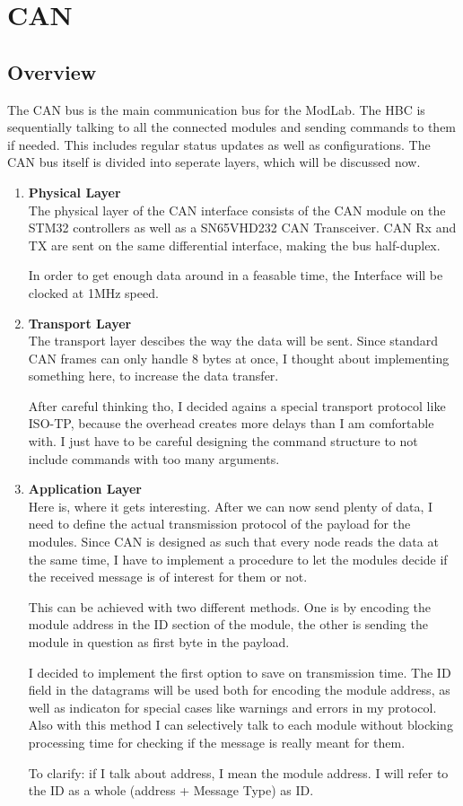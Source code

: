 \section{CAN}
\subsection{Overview}
The CAN bus is the main communication bus for the ModLab. The HBC is sequentially talking to all the connected modules and sending commands to them if needed. This includes regular status updates as well as configurations. The CAN bus itself is divided into seperate layers, which will be discussed now. 

\begin{enumerate}
    \item \textbf{Physical Layer}\\
    The physical layer of the CAN interface consists of the CAN module on the STM32 controllers as well as a SN65VHD232 CAN Transceiver. CAN Rx and TX are sent on the same differential interface, making the bus half-duplex. 

    In order to get enough data around in a feasable time, the Interface will be clocked at 1MHz speed. 
    \item \textbf{Transport Layer}\\
    The transport layer descibes the way the data will be sent. Since standard CAN frames can only handle 8 bytes at once, I thought about implementing something here, to increase the data transfer. 
    
    After careful thinking tho, I decided agains a special transport protocol like ISO-TP, because the overhead creates more delays than I am comfortable with. I just have to be careful designing the command structure to not include commands with too many arguments.

    \item \textbf{Application Layer}\\
    Here is, where it gets interesting. After we can now send plenty of data, I need to define the actual transmission protocol of the payload for the modules. Since CAN is designed as such that every node reads the data at the same time, I have to implement a procedure to let the modules decide if the received message is of interest for them or not. 

    This can be achieved with two different methods. One is by encoding the module address in the ID section of the module, the other is sending the module in question as first byte in the payload. 

    I decided to implement the first option to save on transmission time. The ID field in the datagrams will be used both for encoding the module address, as well as indicaton for special cases like warnings and errors in my protocol. Also with this method I can selectively talk to each module without blocking processing time for checking if the message is really meant for them. 

    To clarify: if I talk about address, I mean the module address. I will refer to the ID as a whole (address + Message Type) as ID.
\end{enumerate}

